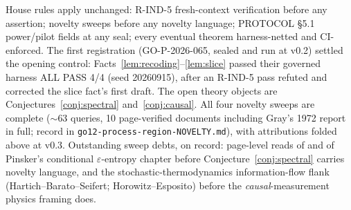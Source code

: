 ﻿\documentclass[11pt]{article}
\theoremstyle{remark}
\begin{document}
House rules apply unchanged: R-IND-5 fresh-context verification before
any assertion; novelty sweeps before any novelty language; PROTOCOL
\S5.1 power/pilot fields at any seal; every eventual theorem
harness-netted and CI-enforced. The first registration
(GO-P-2026-065, sealed and run at v0.2) settled the opening control:
Facts~\ref{lem:recoding}--\ref{lem:slice} passed their governed
harness ALL PASS 4/4 (seed 20260915), after an R-IND-5 pass refuted
and corrected the slice fact's first draft. The open theory objects
are Conjectures~\ref{conj:spectral} and~\ref{conj:causal}. All four
novelty sweeps are complete ($\sim$63 queries, 10 page-verified
documents including Gray's 1972 report in full; record in
\texttt{go12-process-region-NOVELTY.md}), with attributions folded
above at v0.3. Outstanding sweep debts, on record: page-level reads of
\cite{gray73} and of Pinsker's conditional $\varepsilon$-entropy
chapter before Conjecture~\ref{conj:spectral} carries novelty
language, and the stochastic-thermodynamics information-flow flank
(Hartich--Barato--Seifert; Horowitz--Esposito) before the
\emph{causal}-measurement physics framing does.
\end{document}
